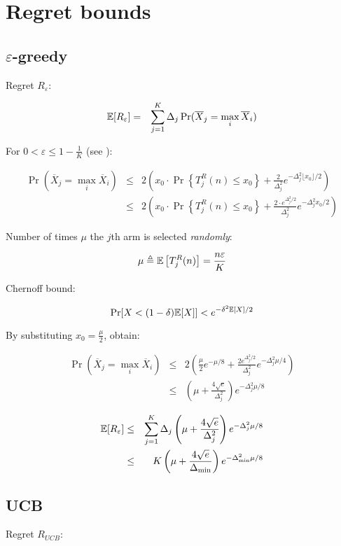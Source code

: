\section{Regret bounds}

\subsection{$\varepsilon$-greedy}

Regret $R_\varepsilon$:

\begin{eqnarray}
\mathbb{E}[R_\varepsilon]&=&\sum_{j=1}^K\Delta_j\Pr(\overline X_j=\max_i\overline X_i)
\end{eqnarray}

For $0<\varepsilon\le1-\frac 1 K$ (see \cite{Auer.ucb}):

\begin{eqnarray}
\Pr(\overline X_j=\max_i\overline X_i)&\le&2\left(x_0\cdot \Pr\left\{T_j^R(n)\le x_0\right\} + \frac 2{\Delta_j^2}e^{-\Delta_j^2\lfloor x_0 \rfloor/2}\right)\nonumber\\
&\le&2\left(x_0\cdot \Pr\left\{T_j^R(n)\le x_0\right\} + \frac {2 \cdot
  e^{\Delta_j^2/2}}{\Delta_j^2}e^{-\Delta_j^2 x_0 /2}\right)
\end{eqnarray}

Number of times $\mu$ the $j$th arm is selected {\it randomly}:

\begin{equation}
\mu\triangleq\mathbb{E}\left[T_j^R(n)\right]=\frac {n\varepsilon} K
\end{equation}

Chernoff bound:

\begin{equation}
\Pr[X < (1-\delta)\mathbb{E}[X]] < e^{-\delta^2\mathbb{E}[X]/2}
\end{equation}

By substituting $x_0=\frac \mu 2$, obtain:

\begin{eqnarray}
\Pr(\overline X_j=\max_i\overline X_i)&\le& 2\left(\frac {\mu}{2} e^{-\mu/8} + \frac {2e^{\Delta_j^2/2}}{\Delta_j^2}e^{-\Delta_j^2 \mu/4}\right)\nonumber\\
&\le&\left(\mu + \frac {4\sqrt e}{\Delta_j^2}\right)e^{-\Delta_j^2\mu/8}
\end{eqnarray}

\begin{eqnarray}
\mathbb{E}[R_\varepsilon]&\le&\sum_{j=1}^K\Delta_j\left(\mu + \frac {4\sqrt e}
{\Delta_j^2}\right)e^{-\Delta_j^2\mu/8}\nonumber\\
&\le&K\left(\mu + \frac {4\sqrt e}{\Delta_{\min}}\right)e^{-\Delta_{\min}^2\mu/8}
\end{eqnarray}

\subsection{UCB}

Regret $R_{UCB}$:

